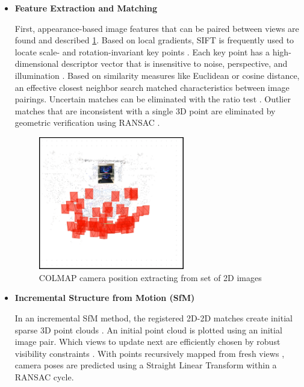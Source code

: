 \begin{itemize}
  \item \textbf{Feature Extraction and Matching}

    First, appearance-based image features that can be paired between views are found and described \ref{fig:COLMAP camera position extracting from 2D images}. Based on local gradients, SIFT is frequently used to locate scale- and rotation-invariant key points \cite{Lowe1999}. Each key point has a high-dimensional descriptor vector that is insensitive to noise, perspective, and illumination \cite{Lowe1999}.
    \vspace{10pt}
      Based on similarity measures like Euclidean or cosine distance, an effective closest neighbor search matched characteristics between image pairings. Uncertain matches can be eliminated with the ratio test \cite{Lowe1999}. Outlier matches that are inconsistent with a single 3D point are eliminated by geometric verification using RANSAC \cite{Lowe2004}.

    \begin{figure}[thbp]
    \centering
    \includegraphics[width=0.6\textwidth]{img/Colmap.png}
    \caption{COLMAP camera position extracting from set of 2D images}\label{fig:COLMAP camera position extracting from 2D images}
    \end{figure}

  \item \textbf{Incremental Structure from Motion (SfM)}
    
     In an incremental SfM method, the registered 2D-2D matches create initial sparse 3D point clouds \cite{Fischler1981}. An initial point cloud is plotted using an initial image pair. Which views to update next are efficiently chosen by robust visibility constraints \cite{Fischler1981}. With points recursively mapped from fresh views \cite{Snavely}, camera poses are predicted using a Straight Linear Transform within a RANSAC cycle.
    

\end{itemize}
